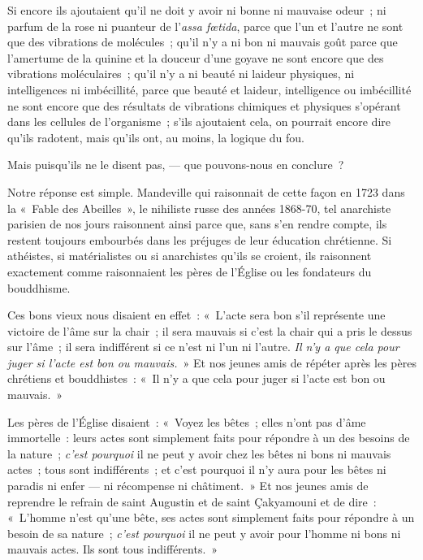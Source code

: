 \documentclass[french,twoside]{book} %
\begin{document}
Si encore ils ajoutaient qu’il ne doit y avoir ni bonne ni mauvaise odeur ; ni parfum de la rose ni puanteur de l’\emph{assa fœtida}, parce que l’un et l’autre ne sont que des vibrations de molécules ; qu’il n’y a ni  bon ni mauvais goût parce que l’amertume de la quinine et la douceur d’une goyave ne sont encore que des vibrations moléculaires ; qu’il n’y a ni beauté ni laideur physiques, ni intelligences ni imbécillité, parce que beauté et laideur, intelligence ou imbécillité ne sont encore que des résultats de vibrations chimiques et physiques s’opérant dans les cellules de l’organisme ; s’ils ajoutaient cela, on pourrait encore dire qu’ils radotent, mais qu’ils ont, au moins, la logique du fou.\par
Mais puisqu’ils ne le disent pas, — que pouvons-nous en conclure ?\par
\bigbreak
\noindent Notre réponse est simple. Mandeville qui raisonnait de cette façon en 1723 dans la « Fable des Abeilles », le nihiliste russe des années 1868-70, tel anarchiste parisien de nos jours raisonnent ainsi parce que, sans s’en rendre compte, ils restent toujours embourbés dans les préjuges de leur éducation chrétienne. Si athéistes, si matérialistes ou si anarchistes qu’ils se croient, ils raisonnent exactement comme raisonnaient les pères de l’Église ou les fondateurs du bouddhisme.\par
Ces bons vieux nous disaient en effet : « L’acte sera bon s’il représente une victoire de l’âme sur la chair ; il sera mauvais si c’est la chair qui a pris le dessus sur l’âme ; il sera indifférent si ce n’est ni l’un ni l’autre. \emph{Il n’y a que cela pour juger si l’acte est bon ou mauvais.} » Et nos jeunes amis de répéter après les pères chrétiens et bouddhistes : « Il n’y a que cela pour juger si l’acte est bon ou mauvais. »\par
Les pères de l’Église disaient : « Voyez les bêtes ; elles n’ont pas d’âme immortelle : leurs actes sont simplement faits pour répondre à un des besoins de la nature ; \emph{c’est pourquoi} il ne peut y avoir chez les bêtes ni bons ni mauvais actes ; tous sont indifférents ; et c’est pourquoi il n’y aura pour les bêtes ni paradis ni enfer — ni récompense ni châtiment. » Et nos jeunes amis de reprendre le refrain de saint Augustin et de saint Çakyamouni et de dire : « L’homme n’est qu’une bête, ses actes sont simplement faits pour répondre à un besoin de sa nature ; \emph{c’est pourquoi} il ne peut y avoir pour l’homme ni bons ni mauvais actes. Ils sont tous indifférents. »\par
\end{document}
